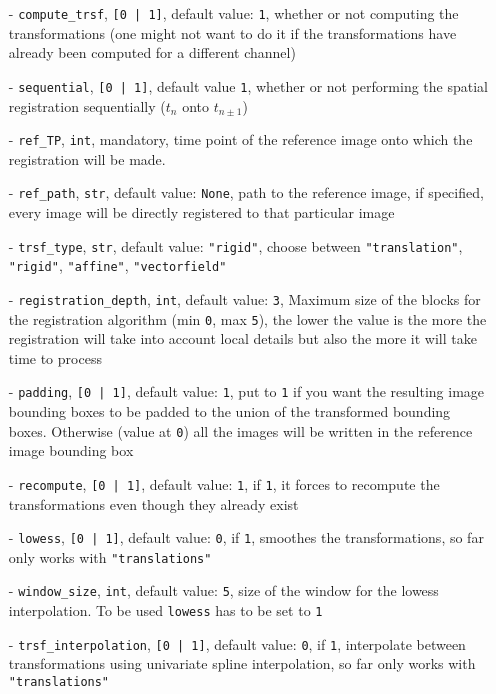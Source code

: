 \documentclass[10pt,a4paper]{book}
\begin{document}
\begin{itemize}
\item[-] \texttt{compute\_trsf}, \texttt{[0 | 1]}, default value: \texttt{1}, whether or not computing the transformations (one might not want to do it if the transformations have already been computed for a different channel)
\item[-] \texttt{sequential}, \texttt{[0 | 1]}, default value \texttt{1}, whether or not performing the spatial registration sequentially ($t_n$ onto $t_{n\pm1}$)
\item[-] \texttt{ref\_TP}, \texttt{int}, mandatory, time point of the reference image onto which the registration will be made.
\item[-] \texttt{ref\_path}, \texttt{str}, default value: \texttt{None}, path to the reference image, if specified, every image will be directly registered to that particular image
\item[-] \texttt{trsf\_type}, \texttt{str}, default value: \texttt{"rigid"}, choose between \texttt{"translation"}, \texttt{"rigid"}, \texttt{"affine"}, \texttt{"vectorfield"}
\item[-] \texttt{registration\_depth}, \texttt{int}, default value: \texttt{3}, Maximum size of the blocks for the registration algorithm (min \texttt{0}, max \texttt{5}), the lower the value is the more the registration will take into account local details but also the more it will take time to process
\item[-] \texttt{padding}, \texttt{[0 | 1]}, default value: \texttt{1}, put to \texttt{1} if you want the resulting image bounding boxes to be padded to the union of the transformed bounding boxes. Otherwise (value at \texttt{0}) all the images will be written in the reference image bounding box
\item[-] \texttt{recompute}, \texttt{[0 | 1]}, default value: \texttt{1}, if \texttt{1}, it forces to recompute the transformations even though they already exist
\item[-] \texttt{lowess}, \texttt{[0 | 1]}, default value: \texttt{0}, if \texttt{1}, smoothes the transformations, so far only works with \texttt{"translations"}
\item[-] \texttt{window\_size}, \texttt{int}, default value: \texttt{5}, size of the window for the lowess interpolation. To be used \texttt{lowess} has to be set to \texttt{1}
\item[-]\texttt{trsf\_interpolation}, \texttt{[0 | 1]}, default value: \texttt{0}, if \texttt{1}, interpolate between transformations using univariate spline interpolation, so far only works with \texttt{"translations"}

\end{itemize}
\end{document}
